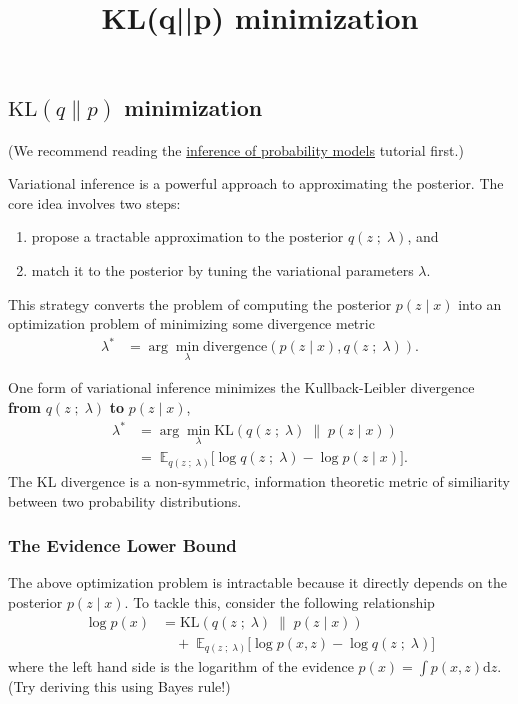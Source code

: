 \title{KL(q||p) minimization}

\subsection{$\text{KL}(q\|p)$ minimization}

(We recommend reading the 
\href{tut_inference_probability_models.html}{inference of probability models}
tutorial first.)

Variational inference is a powerful approach to approximating the posterior. The
core idea involves two steps:
\begin{enumerate}
   \item propose a tractable approximation to the posterior $q(z\;;\;\lambda)$,
   and
   \item match it to the posterior by tuning the variational
   parameters $\lambda$.
 \end{enumerate} 
This strategy converts the problem of computing the posterior $p(z \mid x)$ into
an optimization problem of minimizing some divergence metric
\begin{align*}
  \lambda^* 
  &=
  \arg\min_\lambda \text{divergence}( 
  p(z \mid x)
  ,
  q(z\;;\;\lambda)
  ).
\end{align*}

One form of variational inference minimizes the Kullback-Leibler divergence 
\textbf{from} $q(z\;;\;\lambda)$ \textbf{to} $p(z \mid x)$,
\begin{align*}
  \lambda^* 
  &=
  \arg\min_\lambda \text{KL}( 
  q(z\;;\;\lambda)
  \;\|\;
  p(z \mid x)
  )\\
  &=\;
  \mathbb{E}_{q(z\;;\;\lambda)}
  \big[
  \log q(z\;;\;\lambda)
  -
  \log p(z \mid x)
  \big].
\end{align*}
The KL divergence is a non-symmetric, information theoretic metric of
similiarity between two probability distributions. 

\subsubsection{The Evidence Lower Bound}

The above optimization problem is intractable because it directly depends on the
posterior $p(z \mid x)$. To tackle this, consider the following relationship
\begin{align*}
  \log p(x)
  &=
  \text{KL}( 
  q(z\;;\;\lambda)
  \;\|\;
  p(z \mid x)
  )\\
  &\quad+\;
  \mathbb{E}_{q(z\;;\;\lambda)}
  \big[
  \log p(x, z)
  -
  \log q(z\;;\;\lambda)
  \big]
\end{align*}
where the left hand side is the logarithm of the evidence 
$p(x) = \int p(x,z) \text{d}z$. (Try deriving this using Bayes rule!)

